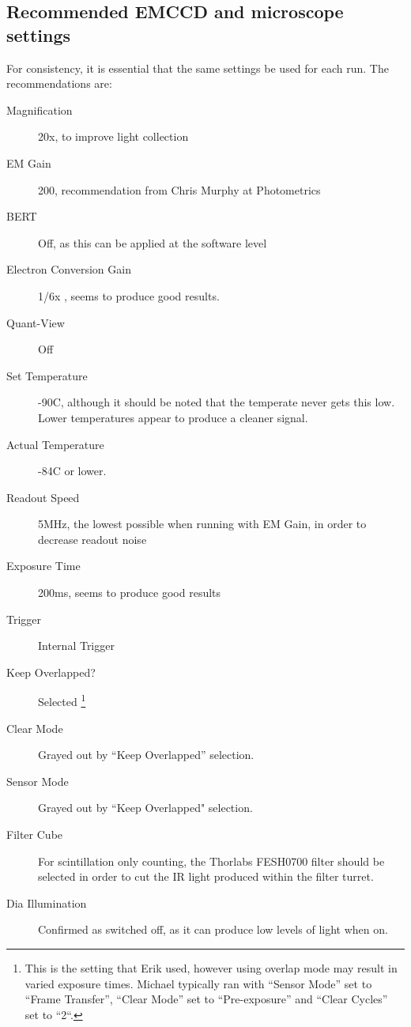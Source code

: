 \documentclass[11pt]{article}
\begin{document}
\subsection{Recommended EMCCD and microscope settings}
For consistency, it is essential that the same settings be used for each run. The recommendations are:
\begin{description}
\item[Magnification] 20x, to improve light collection 
\item[EM Gain] 200, recommendation from Chris Murphy at Photometrics 
\item[BERT] Off, as this can be applied at the software level
\item[Electron Conversion Gain] 1/6x , seems to produce good results.
\item[Quant-View] Off
\item[Set Temperature] -90C, although it should be noted that the temperate never gets this low. Lower temperatures appear to produce a cleaner signal. 
\item[Actual Temperature] -84C or lower. 
\item[Readout Speed] 5MHz, the lowest possible when running with EM Gain, in order to decrease readout noise
\item[Exposure Time] 200ms, seems to produce good results
\item[Trigger] Internal Trigger 
\item[Keep Overlapped?] Selected \footnote{This is the setting that Erik used, however using overlap mode may result in varied exposure times.  Michael typically ran with ``Sensor Mode'' set to ``Frame Transfer'', ``Clear Mode'' set to ``Pre-exposure'' and ``Clear Cycles'' set to ``2``. }
\item[Clear Mode] Grayed out by ``Keep Overlapped'' selection.
\item[Sensor Mode] Grayed out by ``Keep Overlapped" selection.
\item[Filter Cube] For scintillation only counting, the Thorlabs FESH0700 filter should be selected in order to cut the IR light produced within the filter turret.
\item[Dia Illumination] Confirmed as switched off, as it can produce low levels of light when on.
\end{description} 
\end{document}
